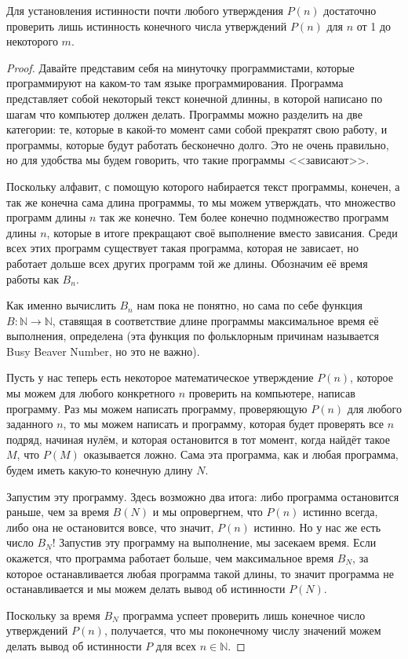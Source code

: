 \begin{thm}
Для установления истинности почти любого утверждения $P(n)$ достаточно проверить лишь истинность конечного числа утверждений $P(n)$ для $n$ от 1 до некоторого $m$.
\end{thm}
\begin{proof}
Давайте представим себя на минуточку программистами, которые программируют на каком-то там языке программирования. Программа представляет собой некоторый текст конечной длинны, в которой написано по шагам что компьютер должен делать. Программы можно разделить на две категории: те, которые в какой-то момент сами собой прекратят свою работу, и программы, которые будут работать бесконечно долго. Это не очень правильно, но для удобства мы будем говорить, что такие программы <<зависают>>.

Поскольку алфавит, с помощую которого набирается текст программы, конечен, а так же конечна сама длина программы, то мы можем утверждать, что множество программ длины $n$ так же конечно. Тем более конечно подмножество программ длины $n$, которые в итоге прекращают своё выполнение вместо зависания. Среди всех этих программ существует такая программа, которая не зависает, но работает дольше всех других программ той же длины. Обозначим её время работы как $B_n$.

Как именно вычислить $B_n$ нам пока не понятно, но сама по себе функция $B:\mathbb{N}\to\mathbb{N}$, ставящая в соответствие длине программы максимальное время её выполнения, определена (эта функция по фольклорным причинам называется Busy Beaver Number, но это не важно).

Пусть у нас теперь есть некоторое математическое утверждение $P(n)$, которое мы можем для любого конкретного $n$ проверить на компьютере, написав программу. Раз мы можем написать программу, проверяющую $P(n)$ для любого заданного $n$, то мы можем написать и программу, которая будет проверять все $n$ подряд, начиная нулём, и которая остановится в тот момент, когда найдёт такое $M$, что $P(M)$ оказывается ложно. Сама эта программа, как и любая программа, будем иметь какую-то конечную длину $N$.

Запустим эту программу. Здесь возможно два итога: либо программа остановится раньше, чем за время $B(N)$ и мы опровергнем, что $P(n)$ истинно всегда, либо она не остановится вовсе, что значит, $P(n)$ истинно. Но у нас же есть число $B_N$! Запустив эту программу на выполнение, мы засекаем время. Если окажется, что программа работает больше, чем максимальное время $B_N$, за которое останавливается любая программа такой длины, то значит программа не останавливается и мы можем делать вывод об истинности $P(N)$.

Поскольку за время $B_N$ программа успеет проверить лишь конечное число утверждений $P(n)$, получается, что мы поконечному числу значений можем делать вывод об истинности $P$ для всех $n\in\mathbb{N}$. 
\end{proof}

